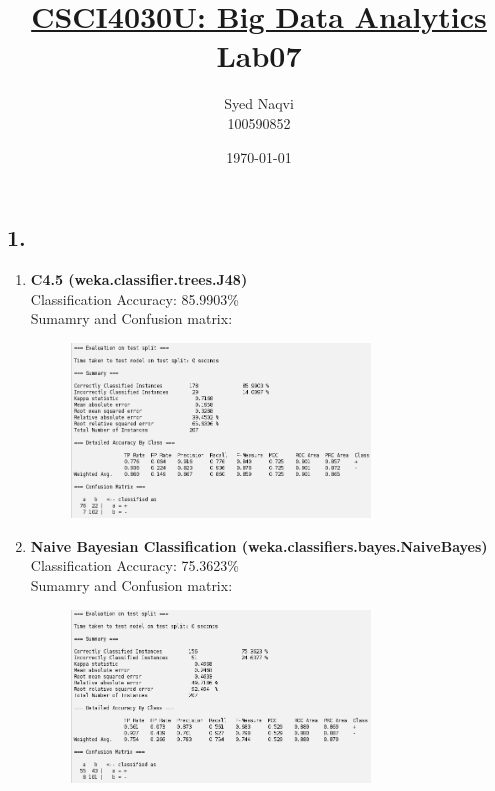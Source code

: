\documentclass{article}
\title{\textbf{\underline{CSCI4030U: Big Data Analytics}\\Lab07}}
\author{Syed Naqvi\\100590852}
\date{\today}
\begin{document}
    \maketitle

    \subsection*{1.}
    
    \begin{enumerate}[label = (\alph*), left=10pt, itemsep=10pt]
        
        \item \begin{minipage}[t]{0.9\textwidth}
            \textbf{C4.5 (weka.classifier.trees.J48)}\\
             Classification Accuracy: 85.9903\%\\
             Sumamry and Confusion matrix:
             \begin{figure}[H]
                \includegraphics[width=0.75\textwidth, height=0.25\textheight]{./7a.png}
            \end{figure}
        \end{minipage}
        \item \begin{minipage}[t]{0.9\textwidth}
            \textbf{Naive Bayesian Classification (weka.classifiers.bayes.NaiveBayes)}\\
             Classification Accuracy: 75.3623\%\\
             Sumamry and Confusion matrix:
             \begin{figure}[H]
                \includegraphics[width=0.75\textwidth, height=0.25\textheight]{./7b.png}

\end{figure}
\end{minipage}
\end{enumerate}
\end{document}
